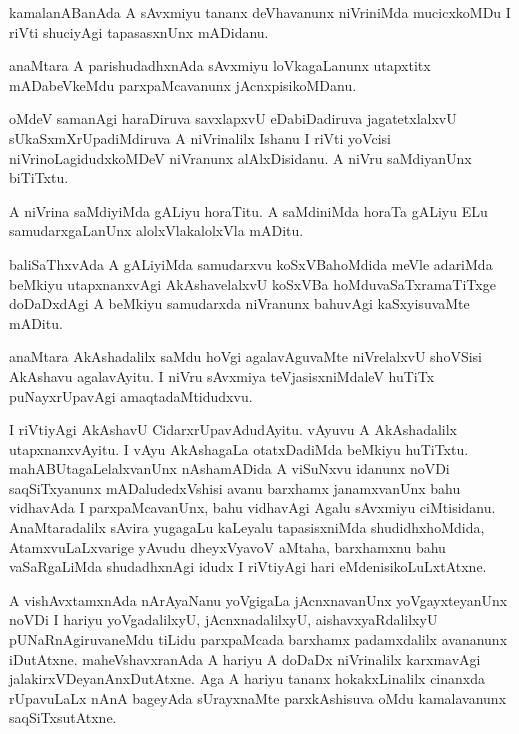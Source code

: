 \begin{mng}
kamalanABanAda A sAvxmiyu tananx deVhavanunx niVriniMda mucicxkoMDu I riVti shuciyAgi tapasasxnUnx mADidanu.
\end{mng}

\begin{mng}
anaMtara A parishudadhxnAda sAvxmiyu loVkagaLanunx utapxtitx mADabeVkeMdu parxpaMcavanunx jAcnxpisikoMDanu.
\end{mng}

\begin{mng}
oMdeV samanAgi haraDiruva savxlapxvU eDabiDadiruva jagatetxlalxvU sUkaSxmXrUpadiMdiruva A niVrinalilx Ishanu I riVti yoVcisi niVrinoLagidudxkoMDeV niVranunx alAlxDisidanu. A niVru saMdiyanUnx biTiTxtu.
\end{mng}

\begin{mng}
A niVrina saMdiyiMda gALiyu horaTitu. A saMdiniMda horaTa gALiyu ELu samudarxgaLanUnx alolxVlakalolxVla mADitu.
\end{mng}

\begin{mng}
baliSaThxvAda A gALiyiMda samudarxvu koSxVBahoMdida meVle adariMda beMkiyu utapxnanxvAgi AkAshavelalxvU koSxVBa hoMduvaSaTxramaTiTxge doDaDxdAgi A beMkiyu samudarxda niVranunx bahuvAgi kaSxyisuvaMte mADitu.
\end{mng}

\begin{mng}
anaMtara AkAshadalilx saMdu hoVgi agalavAguvaMte niVrelalxvU shoVSisi AkAshavu agalavAyitu. I niVru sAvxmiya teVjasisxniMdaleV huTiTx puNayxrUpavAgi amaqtadaMtidudxvu.
\end{mng}

\begin{mng}
I riVtiyAgi AkAshavU CidarxrUpavAdudAyitu. vAyuvu A AkAshadalilx utapxnanxvAyitu. I vAyu AkAshagaLa otatxDadiMda beMkiyu huTiTxtu. mahABUtagaLelalxvanUnx nAshamADida A viSuNxvu idanunx noVDi saqSiTxyanunx mADaludedxVshisi avanu barxhamx janamxvanUnx bahu vidhavAda I parxpaMcavanUnx, bahu vidhavAgi Agalu sAvxmiyu ciMtisidanu. AnaMtaradalilx sAvira yugagaLu kaLeyalu tapasisxniMda shudidhxhoMdida, AtamxvuLaLxvarige yAvudu dheyxVyavoV aMtaha, barxhamxnu bahu vaSaRgaLiMda shudadhxnAgi idudx I riVtiyAgi hari eMdenisikoLuLxtAtxne.
\end{mng}

\begin{mng}
A vishAvxtamxnAda nArAyaNanu yoVgigaLa jAcnxnavanUnx yoVgayxteyanUnx noVDi I hariyu yoVgadalilxyU, jAcnxnadalilxyU, aishavxyaRdalilxyU pUNaRnAgiruvaneMdu tiLidu parxpaMcada barxhamx padamxdalilx avananunx iDutAtxne. maheVshavxranAda A hariyu A doDaDx niVrinalilx karxmavAgi jalakirxVDeyanAnxDutAtxne. Aga A hariyu tananx hokakxLinalilx cinanxda rUpavuLaLx nAnA bageyAda sUrayxnaMte parxkAshisuva oMdu kamalavanunx saqSiTxsutAtxne. 
\end{mng}

